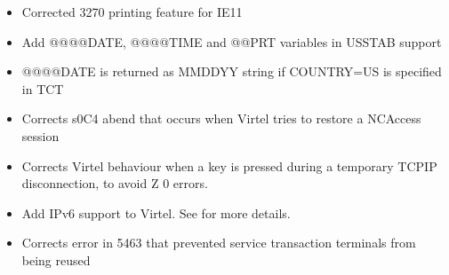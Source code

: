 \documentclass[letterpaper,10pt,english]{sphinxmanual}
\begin{document}
\begin{itemize}
\item {} 
Corrected 3270 printing feature for IE11

\end{itemize}

\newpage

\begin{itemize}
\item {} 
Add @@@@DATE, @@@@TIME and @@PRT variables in USSTAB support

\end{itemize}

\begin{itemize}
\item {} 
@@@@DATE is returned as MMDDYY string if COUNTRY=US is specified in TCT

\end{itemize}

\begin{itemize}
\item {} 
Corrects s0C4 abend that occurs when Virtel tries to restore a NCAccess session

\end{itemize}

\begin{itemize}
\item {} 
Corrects Virtel behaviour when a key is pressed during a temporary TCPIP disconnection, to avoid Z 0 errors.

\end{itemize}

\begin{itemize}
\item {} 
Add IPv6 support to Virtel. See  for more details.

\end{itemize}

\begin{itemize}
\item {} 
Corrects error in 5463 that prevented service transaction terminals from being reused

\end{itemize}
\end{document}
